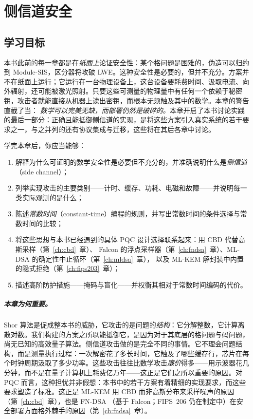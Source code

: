 \chapter{侧信道安全}
\label{ch:sidechannel}

\section{学习目标}

本书此前的每一章都是在\emph{纸面上}论证安全性：某个格问题是困难的，伪造可以归约到 Module-SIS，区分器将攻破 LWE。这种安全性是必要的，但并不充分。方案并不在纸面上运行；它运行在一台物理设备上，这台设备要耗费时间、汲取电流、向外辐射，还可能被激光照射。只要这些可测量的物理量中有任何一个依赖于秘密钥，攻击者就能直接从机器上读出密钥，而根本无须触及其中的数学。本章的警告直截了当：
\emph{数学可以完美无缺，而部署仍然是破碎的。}本章开启了本书讨论实践的最后一部分：正确且能抵御侧信道的实现，是将这些方案引入真实系统的若干要求之一，与之并列的还有协议集成与迁移，这些将在其后各章中讨论。

学完本章后，你应当能够：

\begin{enumerate}
  \item 解释为什么可证明的数学安全性是必要但不充分的，并准确说明什么是\emph{侧信道}（side channel）；
  \item 列举实现攻击的主要类别——计时、缓存、功耗、电磁和故障——并说明每一类实际观测的是什么；
  \item 陈述\emph{常数时间}（constant-time）编程的规则，并写出常数时间的条件选择与常数时间的比较；
  \item 将这些思想与本书已经遇到的具体 PQC 设计选择联系起来：用 CBD 代替高斯采样（第~\ref{ch:cbd}~章）、
        Falcon 的浮点采样器（第~\ref{ch:fndsa}~章）、ML-DSA 的确定性中止循环（第~\ref{ch:mldsa}~章），
        以及 ML-KEM 解封装中内置的隐式拒绝（第~\ref{ch:fips203}~章）；
  \item 描述高阶防护措施——掩码与盲化——并权衡其相对于常数时间编码的代价。
\end{enumerate}

\paragraph{本章为何重要。}
Shor 算法是促成整本书的威胁，它攻击的是问题的\emph{结构}：它分解整数，它计算离散对数。我们构建的方案之所以能抵御它，是因为对于其底层的格问题与码问题，尚无已知的高效量子算法。侧信道攻击做的是完全不同的事情。它不理会问题结构，而是测量执行过程：一次解密花了多长时间，它触及了哪些缓存行，芯片在每个时钟周期汲取了多少功率。这些攻击往往比数学攻击\emph{廉价}得多——用示波器花几分钟，而不是在量子计算机上耗费亿万年——这正是它们之所以重要的原因。对 PQC 而言，这种担忧并非假想：本书中的若干方案有着精细的实现要求，而这些要求塑造了标准。这正是 ML-KEM 用 CBD 而非高斯分布来采样噪声的原因（第~\ref{ch:cbd}~章），也是 FN-DSA
（基于 Falcon；FIPS~206 仍在制定中）在安全部署方面格外棘手的原因（第~\ref{ch:fndsa}~章）。

